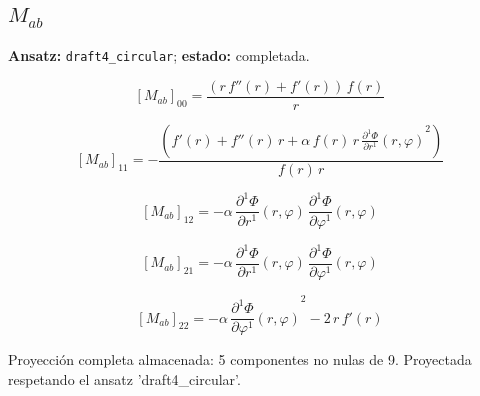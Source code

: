 \documentclass[11pt]{article}
\begin{document}
\subsection*{$ M_{ab} $}
\textbf{Ansatz:} \texttt{draft4\_circular}; \textbf{estado:} completada.\par
\begin{dmath*}[breakdepth={5}]
\left[M_{ab}\right]_{00} = \frac{\left(r\,f''\!\left(r\right) + f'\!\left(r\right)\right)\,f\!\left(r\right)}{r}
\end{dmath*}
\par\smallskip
\begin{dmath*}[breakdepth={5}]
\left[M_{ab}\right]_{11} = -\frac{\left(f'\!\left(r\right) + f''\!\left(r\right)\,r + \alpha\,f\!\left(r\right)\,r\,{\frac{\partial^{1} \Phi}{\partial r^{1}}\!\left(r, \varphi\right)}^{2}\right)}{f\!\left(r\right)\,r}
\end{dmath*}
\par\smallskip
\begin{dmath*}[breakdepth={5}]
\left[M_{ab}\right]_{12} = -\alpha\,\frac{\partial^{1} \Phi}{\partial r^{1}}\!\left(r, \varphi\right)\,\frac{\partial^{1} \Phi}{\partial \varphi^{1}}\!\left(r, \varphi\right)
\end{dmath*}
\par\smallskip
\begin{dmath*}[breakdepth={5}]
\left[M_{ab}\right]_{21} = -\alpha\,\frac{\partial^{1} \Phi}{\partial r^{1}}\!\left(r, \varphi\right)\,\frac{\partial^{1} \Phi}{\partial \varphi^{1}}\!\left(r, \varphi\right)
\end{dmath*}
\par\smallskip
\begin{dmath*}[breakdepth={5}]
\left[M_{ab}\right]_{22} = -\alpha\,{\frac{\partial^{1} \Phi}{\partial \varphi^{1}}\!\left(r, \varphi\right)}^{2} - 2\,r\,f'\!\left(r\right)
\end{dmath*}
\par\smallskip
Proyección completa almacenada: 5 componentes no nulas de 9. Proyectada respetando el ansatz 'draft4\_circular'.\par\medskip
{}
\end{document}
